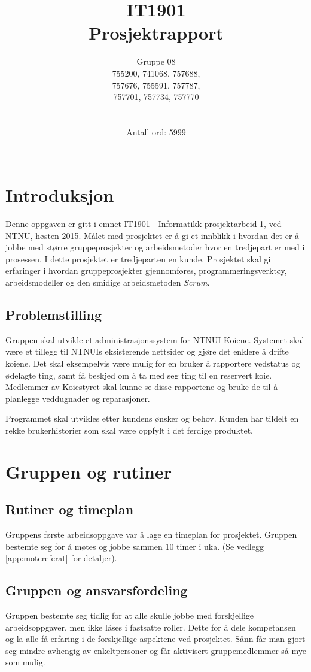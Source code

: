 \documentclass[12pt,a4paper,norsk]{article}
\title{IT1901 \\ Prosjektrapport}
\author{Gruppe 08\\
    755200, 741068, 757688,\\
    757676, 755591, 757787,\\
    757701, 757734, 757770\\ \\ \\
    Antall ord: 5999 \\ \\}
\begin{document}
  \maketitle
  \newpage
  \tableofcontents
  \newpage
  \section{Introduksjon}

Denne oppgaven er gitt i emnet IT1901 - Informatikk prosjektarbeid 1, ved NTNU, høsten 2015. Målet med prosjektet er å gi et innblikk i hvordan det er å jobbe med større gruppeprosjekter og arbeidsmetoder hvor en tredjepart er med i prosessen. I dette prosjektet er tredjeparten en kunde. Prosjektet skal gi erfaringer i hvordan gruppeprosjekter gjennomføres, programmeringsverktøy, arbeidsmodeller og den smidige arbeidsmetoden \textit{Scrum}.

\subsection{Problemstilling}

Gruppen skal utvikle et administrasjonssystem for NTNUI Koiene. Systemet skal være et tillegg til NTNUIs eksisterende nettsider og gjøre det enklere å drifte koiene. Det skal eksempelvis være mulig for en bruker å rapportere vedstatus og ødelagte ting, samt få beskjed om å ta med seg ting til en reservert koie. Medlemmer av Koiestyret skal kunne se disse rapportene og bruke de til å planlegge veddugnader og reparasjoner.

Programmet skal utvikles etter kundens ønsker og behov. Kunden har tildelt en rekke brukerhistorier som skal være oppfylt i det ferdige produktet.

\section{Gruppen og rutiner}
\subsection{Rutiner og timeplan}

Gruppens første arbeidsoppgave var å lage en timeplan for prosjektet. Gruppen bestemte seg for å møtes og jobbe sammen 10 timer i uka. (Se vedlegg \cref{app:motereferat} for detaljer).

\subsection{Gruppen og ansvarsfordeling}
Gruppen bestemte seg tidlig for at alle skulle jobbe med forskjellige arbeidsoppgaver, men ikke låses i fastsatte roller. Dette for å dele kompetansen og la alle få erfaring i de forskjellige aspektene ved prosjektet. Sånn får man gjort seg mindre avhengig av enkeltpersoner og får aktivisert gruppemedlemmer så mye som mulig.
\end{document}
